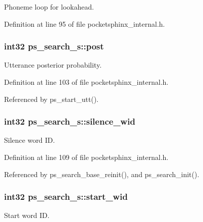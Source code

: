 Phoneme loop for lookahead. 



Definition at line 95 of file pocketsphinx\-\_\-internal.\-h.

\subsubsection[{post}]{\setlength{\rightskip}{0pt plus 5cm}int32 ps\-\_\-search\-\_\-s\-::post}\label{structps__search__s_a721a656d0e34f7604ea8c52a1bdf14ff}


Utterance posterior probability. 



Definition at line 103 of file pocketsphinx\-\_\-internal.\-h.



Referenced by ps\-\_\-start\-\_\-utt().

\subsubsection[{silence\-\_\-wid}]{\setlength{\rightskip}{0pt plus 5cm}int32 ps\-\_\-search\-\_\-s\-::silence\-\_\-wid}\label{structps__search__s_ab6851b4675f38ab6b3683d75521f000b}


Silence word I\-D. 



Definition at line 109 of file pocketsphinx\-\_\-internal.\-h.



Referenced by ps\-\_\-search\-\_\-base\-\_\-reinit(), and ps\-\_\-search\-\_\-init().

\subsubsection[{start\-\_\-wid}]{\setlength{\rightskip}{0pt plus 5cm}int32 ps\-\_\-search\-\_\-s\-::start\-\_\-wid}\label{structps__search__s_ae1a9fa33bfc851ec91ce96870714b3cc}


Start word I\-D. 



